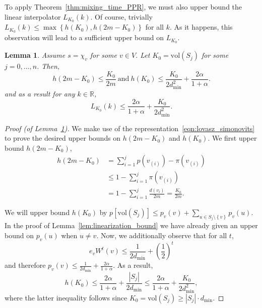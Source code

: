 \documentclass[11pt,twoside]{article}
\newtheorem{lemma}{Lemma}
\theoremstyle{definition}
\newcommand{\set}[1]{\left\{#1\right\}}
\newcommand{\vol}{\mathrm{vol}}
\newcommand{\abs}[1]{\left \lvert #1 \right \rvert}
\newcommand{\Reals}{\mathbb{R}}
\newcommand{\1}{\mathbbm{1}}
\begin{document}
To apply Theorem~\ref{thm:mixing_time_PPR}, we must also upper bound the linear interpolator $L_{K_0}(k)$. Of course, trivially $L_{K_0}(k) \leq \max\set{h(K_0), h(2m - K_0)}$ for all $k$. As it happens, this observation will lead to a sufficient upper bound on $L_{K_0}$.
\begin{lemma}
	\label{lem:interpolator_bound}
	Assume $s = \chi_v$ for some $v \in V$. Let $K_0 = \vol(S_j)$ for some $j = 0,\ldots,n$. Then, 
	\begin{equation*}
	h(2m - K_0) \leq \frac{K_0}{2m} ~\mathrm{and}~ h(K_0) \leq \frac{K_0}{2d_{\min}^2} + \frac{2\alpha}{1 + \alpha}.
	\end{equation*}
	and as a result for any $k \in \Reals$,
	\begin{equation*}
	L_{K_0}(k) \leq \frac{2\alpha}{1 + \alpha} + \frac{K_0}{2d_{\min}^2}.
	\end{equation*}
\end{lemma}
\begin{proof}[Proof (of Lemma~\ref{lem:interpolator_bound})]
	We make use of the representation~\eqref{eqn:lovasz_simonovits} to prove the desired upper bounds on $h(2m - K_0)$ and $h(K_0)$. We first upper bound $h(2m - K_0)$,
	\begin{align*}
	h(2m - K_0) & = \sum_{i = 1}^{j} p(v_{(i)}) - \pi(v_{(i)}) \\
	& \leq 1 - \sum_{i = 1}^{j} \pi(v_{(i)}) \\
	& = 1 - \sum_{i = 1}^{j} \frac{d(v_{i})}{2m} = \frac{K_0}{2m}.
	\end{align*}
	
	We will upper bound $h(K_0)$ by $p[\vol(S_j)] \leq p_v(v) + \sum_{u \in S_j \setminus \set{v}}p_v(u)$. In the proof of Lemma~\ref{lem:linearization_bound} we have already given an upper bound on $p_v(u)$ when $u \neq v$. Now, we additionally observe that for all $t$,
	\begin{equation*}
	e_vW^t(v) \leq \frac{1}{2d_{\min}} + \left(\frac{1}{2}\right)^t
	\end{equation*}
	and therefore $p_v(v) \leq \frac{1}{2d_{\min}} + \frac{2\alpha}{1 + \alpha}$.
	As a result,
	\begin{equation}
	h(K_0) \leq \frac{2\alpha}{1 + \alpha} + \frac{\abs{S_j}}{2d_{\min}} \leq \frac{2\alpha}{1 + \alpha} + \frac{K_0}{2d_{\min}^2},
	\end{equation}
	where the latter inequality follows since $K_0 = \vol(S_j) \geq \abs{S_j}\cdot d_{\min}$.
\end{proof}
\end{document}
